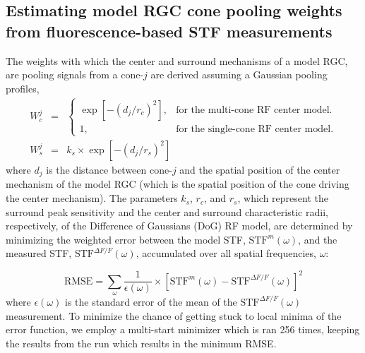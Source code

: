 \documentclass[11pt, oneside]{article}   	%
\begin{document}
\subsection{Estimating model RGC cone pooling weights from fluorescence-based STF measurements}
%
The weights with which the center and surround mechanisms of a model RGC, are pooling signals from a cone-$j$ are derived assuming a Gaussian pooling profiles,
\begin{eqnarray}
W_c^j  & = & \begin{cases}
    \exp \left [ -\left( d_{j}/r_c \right) ^2 \right ], & \text{for the multi-cone RF center model}.\\
   1, & \text{for the single-cone RF center model}.
   \end{cases} \\
W_s^j &= &k_s \times \exp \left [ -\left( d_{j}/r_s \right) ^2 \right ]
\end{eqnarray}
\noindent where $d_j$ is the distance between cone-$j$ and the spatial position of the center mechanism of the model RGC (which is the spatial position of the cone driving the center mechanism). The parameters $k_s$, $r_c$, and $r_s$, which represent the surround peak sensitivity and the center and surround characteristic radii, respectively, of the Difference of Gaussians (DoG) RF model, are determined by minimizing the weighted error between the model STF, $\mbox{STF}^{m}(\omega)$, and the measured STF, $\mbox{STF}^{\Delta F / F}(\omega)$, accumulated over all spatial frequencies, $\omega$:

\begin{equation}
\mbox{RMSE} = \displaystyle \sum_{\omega} \frac{1}{\epsilon({\omega})} \times {\left [  \mbox{STF}^{m}(\omega)  - \mbox{STF}^{\Delta F / F}(\omega) \right ] }^2
\end{equation}
where $\epsilon({\omega})$ is the standard error of the mean of the $\mbox{STF}^{\Delta F / F}(\omega)$ measurement. To minimize the chance of getting stuck to local minima of the error function, we employ a multi-start minimizer which is ran 256 times, keeping the results from the run which results in the minimum RMSE.
\end{document}
